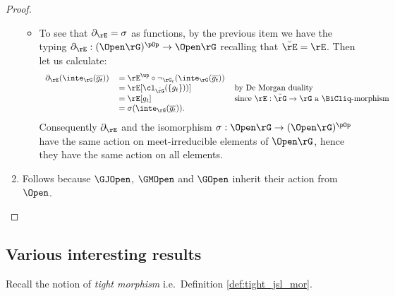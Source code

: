 \documentclass{article}
\begin{document}
\begin{proof}
\begin{enumerate}
\begin{itemize}
\item
To see that $\partial_\rE = \sigma$ as functions, by the previous item we have the typing $\partial_\rE : (\Open\rG)^{\pOp} \to \Open\rG$ recalling that $\breve{\rE} = \rE$. Then let us calculate:
\[
\begin{tabular}{lll}
$\partial_\rE(\inte_\rG(\overline{g_t}))$
&
$= \rE^\up \circ \neg_{\rG_t}(\inte_\rG(\overline{g_t}))$
\\&
$= \rE[\cl_{\breve{\rG}}(\{g_t\}))]$
& by De Morgan duality
\\&
$= \rE[g_t]$
& since $\rE : \breve{\rG} \to \rG$ a $\BiCliq$-morphism
\\&
$= \sigma(\inte_\rG(\overline{g_t}))$.
\end{tabular}
\]
Consequently $\partial_\rE$ and the isomorphism $\sigma : \Open\rG \to (\Open\rG)^{\pOp}$ have the same action on meet-irreducible elements of $\Open\rG$, hence they have the same action on all elements.

\end{itemize}

\item
Follows because $\GJOpen$, $\GMOpen$ and $\GOpen$ inherit their action from $\Open$.
\end{enumerate}
\end{proof}


\subsection{Various interesting results}

Recall the notion of \emph{tight morphism} i.e.\ Definition \ref{def:tight_jsl_mor}.
\end{document}
